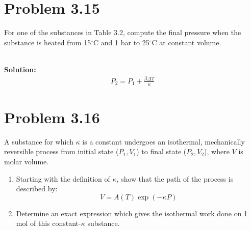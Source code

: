 \documentclass{article}
\newcommand*\widefbox[1]{\fbox{\vspace{0.5em}\hspace{2em}#1\hspace{2em}\vspace{0.5em}}}
\newenvironment{solution}{\par\noindent\textbf{\\Solution:\\}}{\par\medskip}
\begin{document}
\section*{Problem 3.15}
For one of the substances in Table 3.2, compute the final pressure
when the substance is heated from 15$^\circ$C and 1 bar to
25$^\circ$C at constant volume.

\begin{solution}
  \begin{gather*}
    P_{2}=P_{1}+\frac{\beta \Delta T}{\kappa }
  \end{gather*}
\end{solution}

\section*{Problem 3.16}
A substance for which $\kappa$ is a constant undergoes an isothermal,
mechanically reversible process from initial state ($P_1, V_1$) to
final state ($P_2, V_2$), where $V$ is molar volume.
\begin{enumerate}
  \item[(a)] Starting with the definition of $\kappa$, show that the
    path of the process is described by:
    $$V = A(T)\exp(-\kappa P)$$
  \item[(b)] Determine an exact expression which gives the isothermal
    work done on 1 mol of this constant-$\kappa$ substance.
\end{enumerate}
\end{document}
